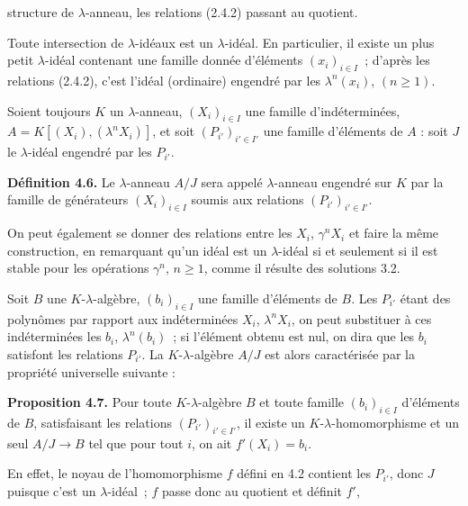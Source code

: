 structure de \(\lambda\)-anneau, les relations (2.4.2) passant au quotient.

Toute intersection de \(\lambda\)-idéaux est un \(\lambda\)-idéal. En particulier, il existe un plus petit \(\lambda\)-idéal contenant une famille donnée d'éléments \((x_i)_{i\in I}\)~; d'après les relations (2.4.2), c'est l'idéal (ordinaire) engendré par les \(\lambda^n(x_i)\), \((n\ge1)\).

Soient toujours \(K\) un \(\lambda\)-anneau, \((X_i)_{i\in I}\) une famille d'indéterminées, \(A=K[(X_i),(\lambda^n X_i)]\), et soit \((P_{i'})_{i'\in I'}\) une famille d'éléments de \(A\) : soit \(J\) le \(\lambda\)-idéal engendré par les \(P_{i'}\).

\textbf{Définition 4.6.} Le \(\lambda\)-anneau \(A/J\) sera appelé \(\lambda\)-anneau engendré sur \(K\) par la famille de générateurs \((X_i)_{i\in I}\) soumis aux relations \((P_{i'})_{i'\in I'}\).

On peut également se donner des relations entre les \(X_i\), \(\gamma^n X_i\) et faire la même construction, en remarquant qu'un idéal est un \(\lambda\)-idéal si et seulement si il est stable pour les opérations \(\gamma^n\), \(n\ge1\), comme il résulte des solutions 3.2.

Soit \(B\) une \(K\)-\(\lambda\)-algèbre, \((b_i)_{i\in I}\) une famille d'éléments de \(B\). Les \(P_{i'}\) étant des polynômes par rapport aux indéterminées \(X_i\), \(\lambda^n X_i\), on peut substituer à ces indéterminées les \(b_i\), \(\lambda^n(b_i)\)~; si l'élément obtenu est nul, on dira que les \(b_i\) satisfont les relations \(P_{i'}\). La \(K\)-\(\lambda\)-algèbre \(A/J\) est alors caractérisée par la propriété universelle suivante :

\textbf{Proposition 4.7.} Pour toute \(K\)-\(\lambda\)-algèbre \(B\) et toute famille \((b_i)_{i\in I}\) d'éléments de \(B\), satisfaisant les relations \((P_{i'})_{i'\in I'}\), il existe un \(K\)-\(\lambda\)-homomorphisme et un seul \(A/J\to B\) tel que pour tout \(i\), on ait \(f'(X_i)=b_i\).

En effet, le noyau de l'homomorphisme \(f\) défini en 4.2 contient les \(P_{i'}\), donc \(J\) puisque c'est un \(\lambda\)-idéal~; \(f\) passe donc au quotient et définit \(f'\),
